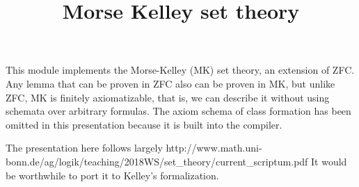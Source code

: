 \documentclass{article}
\title{Morse Kelley set theory}
\author{}
\date{}
\begin{document}

  \maketitle

  This module implements the Morse-Kelley (MK) set theory,
  an extension of ZFC. Any lemma that can be proven in ZFC
  also can be proven in MK, but unlike ZFC, MK is finitely axiomatizable,
  that is, we can describe it without using schemata over arbitrary formulas.
  The axiom schema of class formation has been omitted in this presentation
  because it is built into the compiler.

  The presentation here follows largely http://www.math.uni-bonn.de/ag/logik/teaching/2018WS/set_theory/current_scriptum.pdf
  It would be worthwhile to port it to Kelley's formalization.
\end{document}
